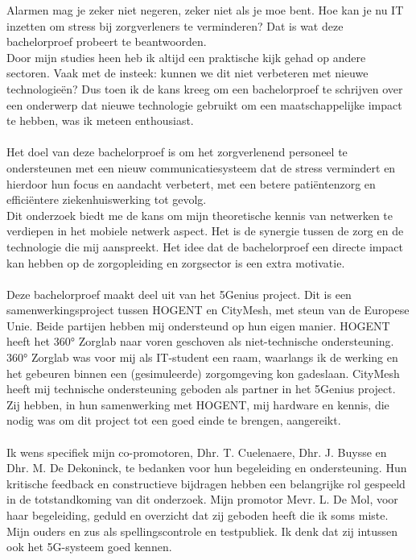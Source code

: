 Alarmen mag je zeker niet negeren, zeker niet als je moe bent. Hoe kan je nu IT inzetten om stress bij zorgverleners te verminderen? Dat is wat deze bachelorproef probeert te beantwoorden.
\\
Door mijn studies heen heb ik altijd een praktische kijk gehad op andere sectoren. Vaak met de insteek: kunnen we dit niet verbeteren met nieuwe technologieën? Dus toen ik de kans kreeg om een bachelorproef te schrijven over een onderwerp dat nieuwe technologie gebruikt om een maatschappelijke impact te hebben, was ik meteen enthousiast.
\\\\
Het doel van deze bachelorproef is om het zorgverlenend personeel te ondersteunen met een nieuw communicatiesysteem dat de stress vermindert en hierdoor hun focus en aandacht verbetert, met een betere patiëntenzorg en efficiëntere ziekenhuiswerking tot gevolg.
\\
Dit onderzoek biedt me de kans om mijn theoretische kennis van netwerken te verdiepen in het mobiele netwerk aspect. Het is de synergie tussen de zorg en de technologie die mij aanspreekt. Het idee dat de bachelorproef een directe impact kan hebben op de zorgopleiding en zorgsector is een extra motivatie.
\\\\
Deze bachelorproef maakt deel uit van het 5Genius project. Dit is een samenwerkingsproject tussen HOGENT en CityMesh, met steun van de Europese Unie. Beide partijen hebben mij ondersteund op hun eigen manier. HOGENT heeft het 360° Zorglab naar voren geschoven als niet-technische ondersteuning. 360° Zorglab was voor mij als IT-student een raam, waarlangs ik de werking en het gebeuren binnen een (gesimuleerde) zorgomgeving kon gadeslaan. CityMesh heeft mij technische ondersteuning geboden als partner in het 5Genius project. Zij hebben, in hun samenwerking met HOGENT, mij hardware en kennis, die nodig was om dit project tot een goed einde te brengen, aangereikt.
\\\\
Ik wens specifiek mijn co-promotoren, Dhr. T. Cuelenaere, Dhr. J. Buysse en Dhr. M. De Dekoninck, te bedanken voor hun begeleiding en ondersteuning. Hun kritische feedback en constructieve bijdragen hebben een belangrijke rol gespeeld in de totstandkoming van dit onderzoek. Mijn promotor Mevr. L. De Mol, voor haar begeleiding, geduld en overzicht dat zij geboden heeft die ik soms miste.
Mijn ouders en zus als spellingscontrole en testpubliek. Ik denk dat zij intussen ook het 5G-systeem goed kennen.

